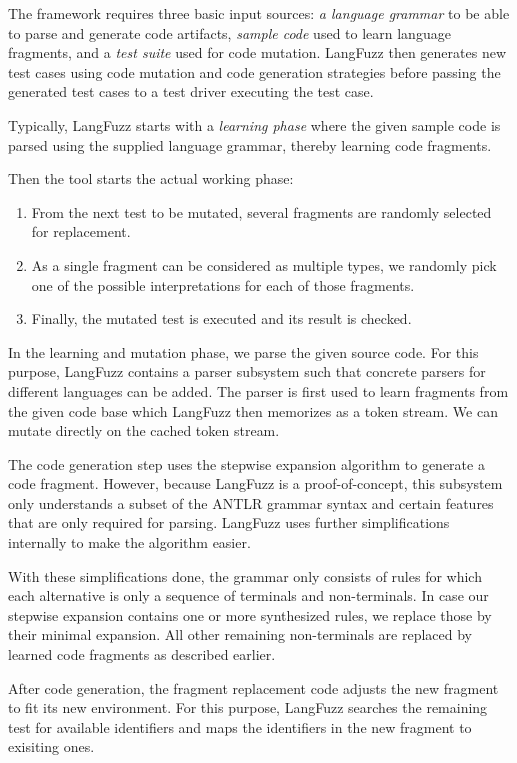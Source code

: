 The framework requires three basic input sources: \textit{a language grammar} to be able to parse and generate code artifacts, \textit{sample code} used to learn language fragments, and a \textit{test suite} used for code mutation.
LangFuzz then generates new test cases using code mutation and code generation strategies before passing the generated test cases to a test driver executing the test case.

Typically, LangFuzz starts with a \textit{learning phase} where the given sample code is parsed using the supplied language grammar, thereby learning code fragments.

Then the tool starts the actual working phase:
\begin{enumerate}
    \item From the next test to be mutated, several fragments are randomly selected for replacement.
    \item As a single fragment can be considered as multiple types, we randomly pick one of the possible interpretations for each of those fragments.
    \item Finally, the mutated test is executed and its result is checked.
\end{enumerate}

In the learning and mutation phase, we parse the given source code. For this purpose, LangFuzz contains a parser subsystem such that concrete parsers for different languages can be added.
The parser is first used to learn fragments from the given code base which LangFuzz then memorizes as a token stream.
We can mutate directly on the cached token stream.

The code generation step uses the stepwise expansion algorithm to generate a code fragment.
However, because LangFuzz is a proof-of-concept, this subsystem only understands a subset of the ANTLR grammar syntax and certain features that are only required for parsing.
LangFuzz uses further simplifications internally to make the algorithm easier.

With these simplifications done, the grammar only consists of rules for which each alternative is only a sequence of terminals and non-terminals.
In case our stepwise expansion contains one or more synthesized rules, we replace those by their minimal expansion.
All other remaining non-terminals are replaced by learned code fragments as described earlier.

After code generation, the fragment replacement code adjusts the new fragment to fit its new environment.
For this purpose, LangFuzz searches the remaining test for available identifiers and maps the identifiers in the new fragment to exisiting ones.

